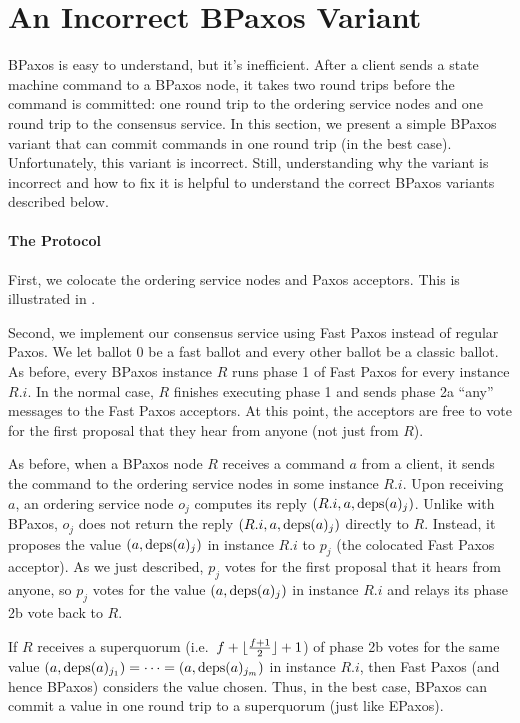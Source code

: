 \section{An Incorrect BPaxos Variant}
BPaxos is easy to understand, but it's inefficient. After a client sends a
state machine command to a BPaxos node, it takes two round trips before the
command is committed: one round trip to the ordering service nodes and one
round trip to the consensus service. In this section, we present a simple
BPaxos variant that can commit commands in one round trip (in the best case).
Unfortunately, this variant is incorrect. Still, understanding why the variant
is incorrect and how to fix it is helpful to understand the correct BPaxos
variants described below.

\paragraph{The Protocol}
First, we colocate the ordering service nodes and Paxos acceptors. This is
illustrated in .

{}

Second, we implement our consensus service using Fast Paxos instead of regular
Paxos. We let ballot $0$ be a fast ballot and every other ballot be a classic
ballot. As before, every BPaxos instance $R$ runs phase 1 of Fast Paxos for
every instance $R.i$. In the normal case, $R$ finishes executing phase 1 and
sends phase 2a ``any'' messages to the Fast Paxos acceptors. At this point, the
acceptors are free to vote for the first proposal that they hear from anyone
(not just from $R$).

As before, when a BPaxos node $R$ receives a command $a$ from a client, it
sends the command to the ordering service nodes in some instance $R.i$. Upon
receiving $a$, an ordering service node $o_j$ computes its reply $(R.i, a,
\text{deps}(a)_j)$. Unlike with BPaxos, $o_j$ does not return the reply $(R.i, a,
\text{deps}(a)_j)$ directly to $R$. Instead, it proposes the value $(a, \text{deps}(a)_j)$
in instance $R.i$ to $p_j$ (the colocated Fast Paxos acceptor). As we just
described, $p_j$ votes for the first proposal that it hears from anyone, so
$p_j$ votes for the value $(a, \text{deps}(a)_j)$ in instance $R.i$ and relays its
phase 2b vote back to $R$.

If $R$ receives a superquorum (i.e.\ $f + \lfloor\frac{f+1}{2}\rfloor + 1$) of phase
2b votes for the same value $(a, \text{deps}(a)_{j_1}) = \cdots = (a,
\text{deps}(a)_{j_{m}})$ in instance $R.i$, then Fast Paxos (and hence BPaxos)
considers the value chosen. Thus, in the best case, BPaxos can commit a value
in one round trip to a superquorum (just like EPaxos).

